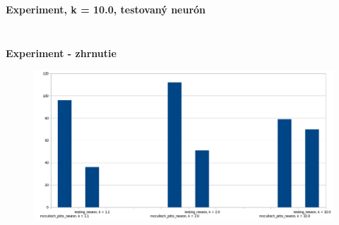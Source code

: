 \documentclass[xcolor=dvipsnames]{beamer}
\begin{document}
\begin{frame}{\bf Experiment, k = 10.0, testovaný neurón}
\begin{columns}
\begin{column}{0.5\textwidth}
\begin{figure}[ht]
        \end{figure}

	\end{column}
\end{columns}

\end{frame}

\begin{frame}[fragile]{\bf Experiment - zhrnutie}

\begin{figure}[ht]
\begin{center}
\begin{minipage}{0.8\linewidth}
\begin{center}
  \includegraphics[width=1.0\textwidth]{comparsion.png}
\end{center}
\end{minipage}
\end{center}
\end{figure}

\end{frame}
\end{document}
